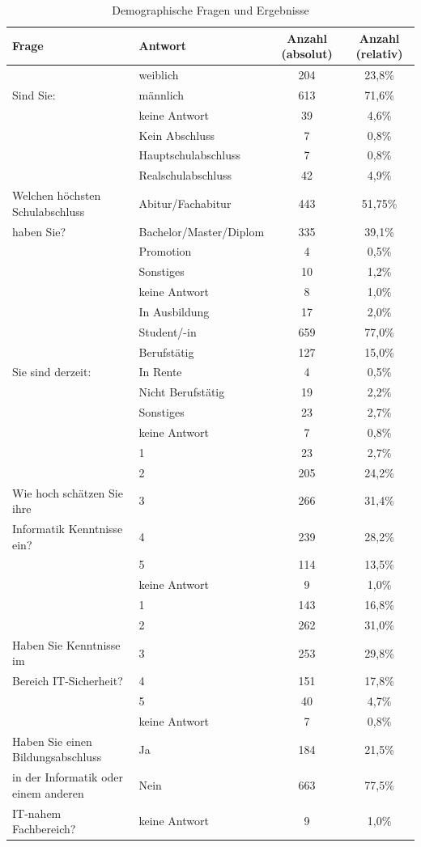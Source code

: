 \begin{table}
	\begin{tabular}[]{ l | l | c | c }
	\hline
	Frage & Antwort & Anzahl (absolut) & Anzahl (relativ) \\
	\hline
	& weiblich &  204 & 23,8\% \\
	Sind Sie:& männlich & 613 & 71,6\% \\
	& keine Antwort & 39 & 4,6\% \\
	\hline \hline
	& Kein Abschluss & 7 & 0,8\% \\
	& Hauptschulabschluss & 7 & 0,8\% \\
	& Realschulabschluss & 42 & 4,9\% \\
	Welchen höchsten Schulabschluss& Abitur/Fachabitur & 443 & 51,75\% \\
	haben Sie? & Bachelor/Master/Diplom & 335 & 39,1\% \\
	& Promotion & 4 & 0,5\% \\
	& Sonstiges & 10 & 1,2\% \\
	& keine Antwort & 8 & 1,0\% \\
	\hline \hline
	& In Ausbildung & 17 & 2,0\% \\
	& Student/-in & 659 & 77,0\% \\
	& Berufstätig & 127 & 15,0\%\\
	Sie sind derzeit: & In Rente & 4 & 0,5\% \\
	& Nicht Berufstätig & 19 & 2,2\% \\
	& Sonstiges & 23 & 2,7\% \\
	& keine Antwort & 7 & 0,8\% \\
	\hline \hline
	& 1 & 23 & 2,7\%\\
	& 2 & 205 & 24,2\% \\
	Wie hoch schätzen Sie ihre & 3 & 266 & 31,4\% \\
	Informatik Kenntnisse ein? & 4 & 239 & 28,2\% \\
	& 5 & 114 & 13,5\% \\
	& keine Antwort & 9 & 1,0\% \\
	\hline \hline
	& 1 & 143 & 16,8\% \\
	& 2 & 262 & 31,0\% \\
	Haben Sie Kenntnisse im& 3 & 253 & 29,8\% \\
	Bereich IT-Sicherheit?& 4 & 151 & 17,8\% \\
	& 5 & 40 & 4,7\% \\
	& keine Antwort & 7 & 0,8\% \\
	\hline \hline
	Haben Sie einen Bildungsabschluss & Ja & 184 & 21,5\% \\
	in der Informatik oder einem anderen & Nein & 663 & 77,5\%\\
	IT-nahem Fachbereich? & keine Antwort & 9 & 1,0\% \\
	\hline
	\end{tabular}
	\caption{Demographische Fragen und Ergebnisse}\label{demoqna}
\end{table}


